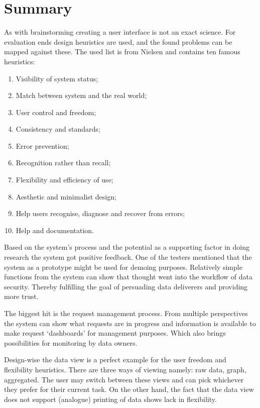 \section{Summary}
\label{evaluation-summary}

As with brainstorming creating a user interface is not an exact science.
For evaluation ends design heuristics are used, and the found problems can be mapped against these.
The used list is from Nielsen \cite{designHeuristics} and contains ten famous heuristics:

\begin{enumerate}
	\item Visibility of system status;
	\item Match between system and the real world;
	\item User control and freedom;
	\item Consistency and standards;
	\item Error prevention;
	\item Recognition rather than recall;
	\item Flexibility and efficiency of use;
	\item Aesthetic and minimalist design;
	\item Help users recognise, diagnose and recover from errors;
	\item Help and documentation.
\end{enumerate}

\noindent{} Based on the system's process and the potential as a supporting factor in doing research the system got positive feedback.
One of the testers mentioned that the system as a prototype might be used for demoing purposes.
Relatively simple functions from the system can show that thought went into the workflow of data security.
Thereby fulfilling the goal of persuading data deliverers and providing more trust.

The biggest hit is the request management process.
From multiple perspectives the system can show what requests are in progress and information is available to make request `dashboards' for management purposes.
Which also brings possibilities for monitoring by data owners.

Design-wise the data view is a perfect example for the user freedom and flexibility heuristics.
There are three ways of viewing namely: raw data, graph, aggregated.
The user may switch between these views and can pick whichever they prefer for their current task.
On the other hand, the fact that the data view does not support (analogue) printing of data shows lack in flexibility.

